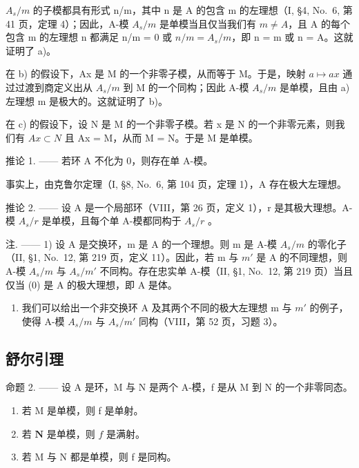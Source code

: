 \(A_{s}/m\) 的子模都具有形式 n/m，其中 n 是 A 的包含 m 的左理想（I, §4, No.~6, 第 41 页，定理 4）；因此，A-模 \(A_{s}/m\) 是单模当且仅当我们有 \(m \neq A\)，且 A 的每个包含 m 的左理想 n 都满足 n/m = 0 或 \(n/m = A_{s}/m\)，即 n = m 或 n = A。这就证明了 a)。

在 b) 的假设下，Ax 是 M 的一个非零子模，从而等于 M。于是，映射 \(a \mapsto ax\) 通过过渡到商定义出从 \(A_{s}/m\) 到 M 的一个同构；因此 A-模 \(A_{s}/m\) 是单模，且由 a) 左理想 m 是极大的。这就证明了 b)。

在 c) 的假设下，设 N 是 M 的一个非零子模。若 x 是 N 的一个非零元素，则我们有 \(Ax \subset N\) 且 Ax = M，从而 M = N。于是 M 是单模。

推论 1. —— 若环 A 不化为 0，则存在单 A-模。

事实上，由克鲁尔定理（I, §8, No.~6, 第 104 页，定理 1），A 存在极大左理想。

推论 2. —— 设 A 是一个局部环（VIII，第 26 页，定义 1），r 是其极大理想。A-模 \(A_{s}/r\) 是单模，且每个单 A-模都同构于 \(A_{s}/r\) 。

注. —— 1) 设 A 是交换环，m 是 A 的一个理想。则 m 是 A-模 \(A_{s}/m\) 的零化子（II, §1, No.~12, 第 219 页，定义 11）。因此，若 m 与 \(m'\) 是 A 的不同理想，则 A-模 \(A_{s}/m\) 与 \(A_{s}/m'\) 不同构。存在忠实单 A-模（II, §1, No.~12, 第 219 页）当且仅当 (0) 是 A 的极大理想，即 A 是体。

\begin{enumerate}
\def\labelenumi{\arabic{enumi})}
\setcounter{enumi}{1}
\tightlist
\item
  我们可以给出一个非交换环 A 及其两个不同的极大左理想 m 与 \(m'\) 的例子，使得 A-模 \(A_{s}/m\) 与 \(A_{s}/m'\) 同构（VIII，第 52 页，习题 3）。
\end{enumerate}

\subsection{舒尔引理}

命题 2. —— 设 A 是环，M 与 N 是两个 A-模，f 是从 M 到 N 的一个非零同态。

\begin{enumerate}
\def\labelenumi{\alph{enumi})}
\item
  若 M 是单模，则 f 是单射。
\item
  若 \(\mathbf{N}\) 是单模，则 \(f\) 是满射。
\item
  若 M 与 N 都是单模，则 f 是同构。
\end{enumerate}

